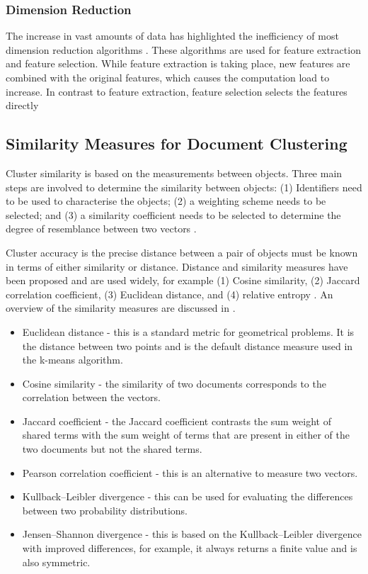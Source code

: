 \subsubsection{Dimension Reduction}

The increase in vast amounts of data has highlighted the inefficiency of most dimension reduction algorithms \cite{mugunthadevi2011survey}. These algorithms are used for feature extraction and feature selection. While feature extraction is taking place, new features are combined with the original features, which causes the computation load to increase. In contrast to feature extraction, feature selection selects the features directly

\subsection{Similarity Measures for Document Clustering} \label{JSD}

Cluster similarity is  based on the measurements between objects. Three main steps are involved to determine the similarity between objects: (1) Identifiers need to be used to characterise the objects; (2) a weighting scheme needs to be selected; and (3) a similarity coefficient needs to be selected to determine the degree of resemblance between two vectors \cite{willett1988recent}.

Cluster accuracy is the precise distance between a pair of objects must be known  in terms of either similarity or distance. Distance and similarity measures have been proposed and are used widely, for example  (1) Cosine similarity, (2) Jaccard correlation coefficient, (3) Euclidean distance, and (4) relative entropy \cite{huang2008similarity}. An overview of the similarity measures are discussed in .

\begin{itemize}
    \item Euclidean distance - this is a standard metric for geometrical problems. It is the distance between two points and is the default distance measure used in the k-means algorithm.
    \item Cosine similarity - the similarity of two documents corresponds to the correlation between the vectors.
    \item Jaccard coefficient - the Jaccard coefficient contrasts the sum weight of shared terms with the sum weight of terms that are present in either of the two documents but not the shared terms.
    \item Pearson correlation coefficient - this is an alternative to measure two vectors.
    \item Kullback–Leibler divergence - this can be used for evaluating the differences between two probability distributions.
    \item Jensen–Shannon divergence - this is based on the Kullback–Leibler divergence with improved differences, for example, it always returns a finite value and is also symmetric.
\end{itemize}


